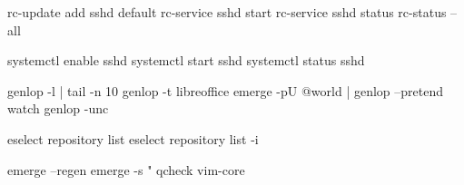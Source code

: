 \documentclass[10pt]{article}
\begin{document}
\begin{multicols}{2}
\begin{cheatbox}{}
rc-update add sshd default
rc-service sshd start
rc-service sshd status
rc-status --all
\end{cheatbox}

\begin{cheatbox}{}
systemctl enable sshd
systemctl start sshd
systemctl status sshd
\end{cheatbox}

\begin{cheatbox}{}
genlop -l | tail -n 10
genlop -t libreoffice
emerge -pU @world | genlop --pretend
watch genlop -unc
\end{cheatbox}

\begin{cheatbox}{}
eselect repository list
eselect repository list -i
\end{cheatbox}

\begin{cheatbox}{}
emerge --regen
emerge -s "%
qcheck vim-core
\end{cheatbox}

\end{multicols}
\end{document}
